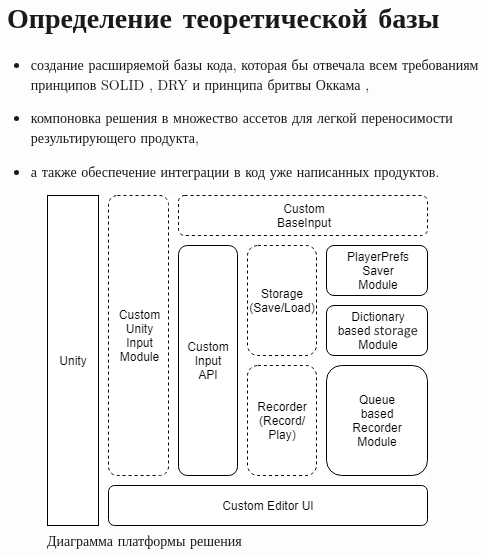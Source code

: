 \section{Определение теоретической базы}

\begin{itemize}
	\item 
	создание расширяемой базы кода, которая бы отвечала всем требованиям принципов SOLID \cite{solid}, DRY \cite{dry} и принципа бритвы Оккама \cite{razor},
	\item
	компоновка решения в множество ассетов для легкой переносимости результирующего продукта, 
	\item а также  обеспечение интеграции в код уже написанных продуктов.
\end{itemize}


\begin{figure}[H]
	\centering
	\includegraphics[width=0.7\linewidth]{platform.png}
	\caption{Диаграмма платформы решения}
	\label{platform}
\end{figure}

